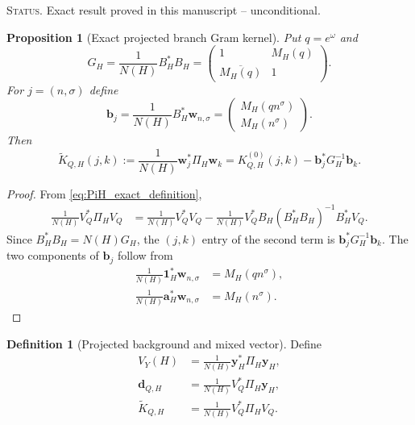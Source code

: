 \documentclass[11pt]{amsart}
\numberwithin{equation}{section}
\theoremstyle{plain}
\newtheorem{proposition}[theorem]{Proposition}
\theoremstyle{definition}
\newtheorem{definition}[theorem]{Definition}
\theoremstyle{remark}
\newcommand{\1}{\mathbf{1}}
\newcommand{\statusnote}[1]{%
  \par\smallskip\noindent
  \begingroup\footnotesize\textsc{Status.} #1\endgroup
  \par\smallskip}
\begin{document}
\statusnote{Exact result proved in this manuscript -- unconditional.}
\begin{proposition}[Exact projected branch Gram kernel]
\label{prop:schur_kernel}
Put $q=e^\omega$ and
\begin{equation}
G_H
=
\frac1{N(H)}B_H^\ast B_H
=
\begin{pmatrix}
1&M_H(q)\\
\overline{M_H(q)}&1
\end{pmatrix}.
\label{eq:joint_gram}
\end{equation}
For $j=(n,\sigma)$ define
\begin{equation}
\mathbf b_j
=
\frac1{N(H)}B_H^\ast\mathbf w_{n,\sigma}
=
\begin{pmatrix}
M_H(qn^\sigma)\\
M_H(n^\sigma)
\end{pmatrix}.
\label{eq:branch_projection_vector}
\end{equation}
Then
\begin{equation}
\boxed{
\widetilde K_{Q,H}(j,k)
:=
\frac1{N(H)}\mathbf w_j^\ast\Pi_H\mathbf w_k
=
K^{(0)}_{Q,H}(j,k)
-
\mathbf b_j^\ast G_H^{-1}\mathbf b_k.
}
\label{eq:schur_kernel_formula}
\end{equation}
\end{proposition}

\begin{proof}
From \eqref{eq:PiH_exact_definition},
\begin{align}
\frac1{N(H)}V_Q^\ast\Pi_HV_Q
&=
\frac1{N(H)}V_Q^\ast V_Q
-
\frac1{N(H)}V_Q^\ast B_H
(B_H^\ast B_H)^{-1}B_H^\ast V_Q.
\label{eq:projected_gram_matrix_expansion}
\end{align}
Since $B_H^\ast B_H=N(H)G_H$, the $(j,k)$ entry of the second term is
$\mathbf b_j^\ast G_H^{-1}\mathbf b_k$.  The two components of
$\mathbf b_j$ follow from
\begin{align}
\frac1{N(H)}\mathbf 1_H^\ast\mathbf w_{n,\sigma}
&=
M_H(qn^\sigma),
\label{eq:branch_projection_constant_component}
\\
\frac1{N(H)}\mathbf a_H^\ast\mathbf w_{n,\sigma}
&=
M_H(n^\sigma).
\label{eq:branch_projection_carrier_component}
\end{align}
\end{proof}

\begin{definition}[Projected background and mixed vector]
\label{def:background_mixed_vector}
Define
\begin{align}
V_Y(H)
&=
\frac1{N(H)}\mathbf y_H^\ast\Pi_H\mathbf y_H,
\label{eq:projected_background_energy}
\\
\mathbf d_{Q,H}
&=
\frac1{N(H)}V_Q^\ast\Pi_H\mathbf y_H,
\label{eq:mixed_background_prime_vector}
\\
\widetilde K_{Q,H}
&=
\frac1{N(H)}V_Q^\ast\Pi_HV_Q.
\label{eq:projected_prime_gram_matrix}
\end{align}
\end{definition}
\end{document}
